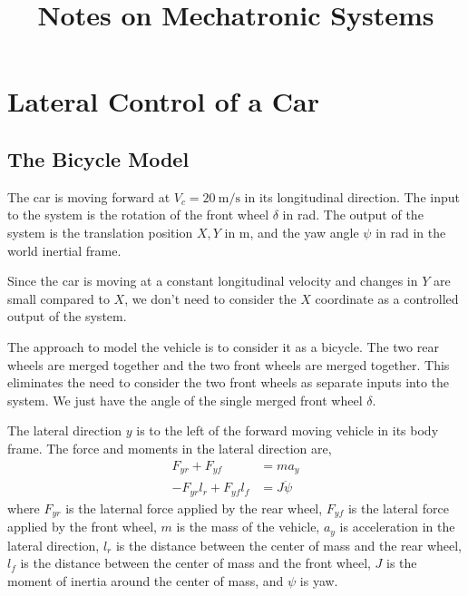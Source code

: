 \documentclass{article}
\title{Notes on Mechatronic Systems}
\begin{document}
\maketitle

\section{Lateral Control of a Car}

\subsection{The Bicycle Model}

The car is moving forward at $V_c = \qty{20}{\metre\per\second}$ in its longitudinal direction. The input to the system
is the rotation of the front wheel $\delta$ in \unit{\radian}. The output of the system is the translation position $X,
Y$ in \unit{\metre}, and the yaw angle $\psi$ in \unit{\radian} in the world inertial frame.

Since the car is moving at a constant longitudinal velocity and changes in $Y$ are small compared to $X$, we don't need
to consider the $X$ coordinate as a controlled output of the system.

The approach to model the vehicle is to consider it as a bicycle. The two rear wheels are merged together and the two
front wheels are merged together. This eliminates the need to consider the two front wheels as separate inputs into the
system. We just have the angle of the single merged front wheel $\delta$.

The lateral direction $y$ is to the left of the forward moving vehicle in its body frame. The force and moments in the
lateral direction are,
\begin{align}
    F_{yr} + F_{yf} &= ma_y \\
    -F_{yr}l_r + F_{yf}l_f &= J\ddot{\psi}
\end{align}
where $F_{yr}$ is the laternal force applied by the rear wheel, $F_{yf}$ is the lateral force applied by the front
wheel, $m$ is the mass of the vehicle, $a_y$ is acceleration in the lateral direction, $l_r$ is the distance between
the center of mass and the rear wheel, $l_f$ is the distance between the center of mass and the front wheel, $J$ is the
moment of inertia around the center of mass, and $\psi$ is yaw.
\end{document}
